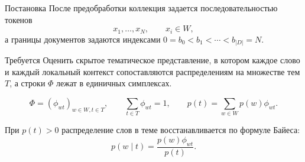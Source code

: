 \documentclass[aspectratio=169]{beamer}
\begin{document}
\begin{frame}{Постановка}
    После предобработки коллекция задается последовательностью токенов
    \[
        x_1,\ldots,x_N,\qquad x_i\in W,
    \]
    а границы документов задаются индексами
    \(0=b_0<b_1<\cdots<b_{|D|}=N\).

    \begin{block}{Требуется}
        Оценить скрытое тематическое представление, в котором каждое слово и
        каждый локальный контекст сопоставляются распределениям на множестве
        тем \(T\), а строки \(\Phi\) лежат в единичных симплексах.
    \end{block}

    \[
        \Phi=(\phi_{wt})_{w\in W,t\in T},\qquad
        \sum_{t\in T}\phi_{wt}=1,\qquad
        p(t)=\sum_{w\in W}p(w)\phi_{wt}.
    \]

    При \(p(t)>0\) распределение слов в теме восстанавливается по формуле
    Байеса:
    \[
        p(w\mid t)=\frac{p(w)\phi_{wt}}{p(t)}.
    \]
\end{frame}
\end{document}
